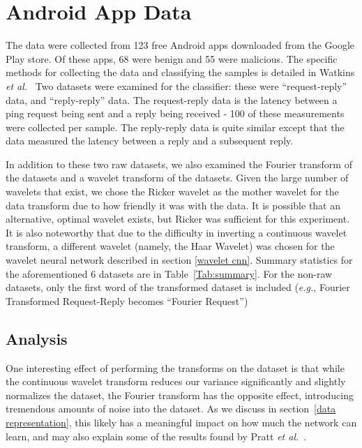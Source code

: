 \documentclass[10pt]{article}
\begin{document}
\section{Android App Data}
The data were collected from 123 free Android apps downloaded from the Google Play store. 
Of these apps, 68 were benign and 55 were malicious.
The specific methods for collecting the data and classifying the samples is detailed in Watkins \textit{et al.}~\cite{watkins2018network}
Two datasets were examined for the classifier: these were ``request-reply'' data, and ``reply-reply'' data.
The request-reply data is the latency between a ping request being sent and a reply being received - 100 of these measurements were collected per sample.
The reply-reply data is quite similar except that the data measured the latency between a reply and a subsequent reply.

In addition to these two raw datasets, we also examined the Fourier transform of the datasets and a wavelet transform of the datasets. 
Given the large number of wavelets that exist, we chose the Ricker wavelet as the mother wavelet for the data transform due to how friendly it was with the data.
It is possible that an alternative, optimal wavelet exists, but Ricker was sufficient for this experiment.
It is also noteworthy that due to the difficulty in inverting a continuous wavelet transform, a different wavelet (namely, the Haar Wavelet) was chosen for the wavelet neural network described in section \ref{wavelet cnn}.
Summary statistics for the aforementioned 6 datasets are in Table~\ref{Tab:summary}. 
For the non-raw datasets, only the first word of the transformed dataset is included (\textit{e.g.}, Fourier Transformed Request-Reply becomes ``Fourier Request'')

\subsection{Analysis}
One interesting effect of performing the transforms on the dataset is that while the continuous wavelet transform reduces our variance significantly and slightly normalizes the dataset, the Fourier transform has the opposite effect, introducing tremendous amounts of noise into the dataset.
As we discuss in section~\ref{data representation}, this likely has a meaningful impact on how much the network can learn, and may also explain some of the results found by Pratt \textit{et al.}~\cite{pratt2017fcnn}.
\end{document}
